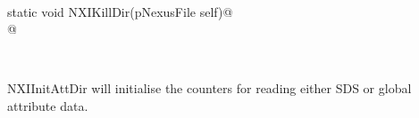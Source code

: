 \documentclass[12pt]{article}
\begin{document}
\begin{flushleft} \small
\begin{minipage}{\linewidth} \label{scrap33}
\vspace{-1ex}
\begin{list}{}{} \item
\mbox{}\verb@@\\
\mbox{}\verb@   static void NXIKillDir(pNexusFile self)@\\
\mbox{}@\\
\end{list}
\vspace{-1ex}
\footnotesize\addtolength{\baselineskip}{-1ex}
\end{minipage}\\[4ex]
\end{flushleft}
NXIInitAttDir will initialise the counters for reading either SDS or global 
attribute data. 
\end{document}
